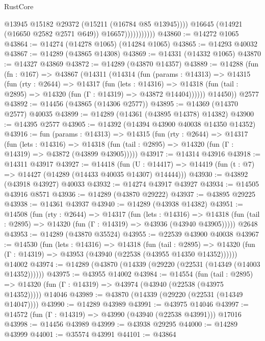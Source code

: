 \begin{lexlean}{RustCore}
\begin{coremodule}
                              @13945
                              @15182
                              @29372
                              (@15211 (@16784 @85 @13945))))
                          @16645
                          (@14921 (@16650 @2582 @2571 @649))
                          @16657)))))))))))
@43860 := @14272 @1065
@43864 := @14274 (@14278 @1065) (@14284 @1065)
@43865 := @14293 @40032
@43867 := @14289 (@43865 @14308)
@43869 := @14331 (@14332 @1065)
@43870 := @14327 @43869
@43872 := @14289 (@43870 @14357)
@43889 := @14288
    (fun (fn : @167) =>
    @43867
      (@14311
        (@14314
          (fun (params : @14313) =>
          @14315
            (fun (rty : @2644) =>
            @14317
              (fun (lets : @14316) =>
              @14318 (fun (tail : @2895) => @14320 (fun (Γ : @14319) => @43872 @14404))))))
        @14450))
    @2577
@43892 := @14456 (@43865 (@14306 @2577))
@43895 := @14369 (@14370 @2577) @40035
@43899 := @14289 (@14361 (@43895 @14378) @14382)
@43900 := @14395 @2577
@43905 := @14392 (@14394 @43900 @40038 @14350 @14352)
@43916 := fun (params : @14313) =>
  @14315
    (fun (rty : @2644) =>
    @14317
      (fun (lets : @14316) =>
      @14318 (fun (tail : @2895) => @14320 (fun (Γ : @14319) => @43872 (@43899 @43905)))))
@43917 := @14314 @43916
@43918 := @14311 @43917
@43927 := @14418
    (fun (U : @14417) => @14419 (fun (t : @7) => @14427 (@14289 (@14433 @40035 @14307) @14444)))
@43930 := @43892 (@43918 @43927) @40033
@43932 := @14274 @43917 @43927
@43934 := @14505 @43916 @8571
@43936 := @14289 (@43870 @29222)
@43937 := @43895 @29225
@43938 := @14361 @43937
@43940 := @14289 (@43938 @14382)
@43951 := @14508
    (fun (rty : @2644) =>
    @14317
      (fun (lets : @14316) =>
      @14318 (fun (tail : @2895) => @14320 (fun (Γ : @14319) => @43936 (@43940 @43905)))))
    @2648
@43953 := @14289 (@43870 @35524)
@43955 := @22539 @43900 @40038
@43967 := @14530
    (fun (lets : @14316) =>
    @14318
      (fun (tail : @2895) =>
      @14320 (fun (Γ : @14319) => @43953 (@43940 (@22538 (@43955 @14350 @14352))))))
    @14002
@43974 := @14289 (@43870 (@14339 (@29220 (@22531 (@14349 (@14003 @14352))))))
@43975 := @43955 @14002
@43984 := @14554
    (fun (tail : @2895) => @14320 (fun (Γ : @14319) => @43974 (@43940 (@22538 (@43975 @14352)))))
    @14046
@43989 := @43870 (@14339 (@29220 (@22531 (@14349 @14047))))
@43990 := @14289 @43989
@43991 := @43975 @14046
@43997 := @14572 (fun (Γ : @14319) => @43990 (@43940 (@22538 @43991))) @17016
@43998 := @14456 @43989
@43999 := @43938 @29295
@44000 := @14289 @43999
@44001 := @35574 @43991
@44101 := @43864

\end{coremodule}
\end{lexlean}
